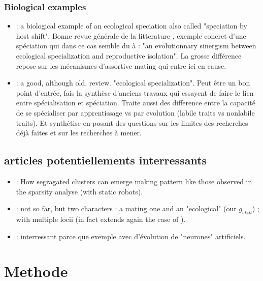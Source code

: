 \documentclass[a4paper,10pt]{article}
\begin{document}
\subsubsection{Biological examples}
\begin{itemize}
\item \cite{caillaud2000specialized} : a biological example of an ecological speciation also called "speciation by host shift". Bonne revue générale de la litterature , exemple concret d'une spéciation qui dans ce cas semble du à : "an evolutionnary sinergism between ecological specialization and reproductive isolation". La grosse différence repose sur les mécanismes d'assortive mating qui entre ici en cause.
\item \cite{futuyma88evolutionofecologicalspecialization} : a good, although old, review. "ecological specialization".  Peut être un bon point d'entrée, fais la synthèse d'anciens travaux qui essayent de faire le lien entre spécialisation et spéciation. Traite aussi des difference entre la capacité de se spécialiser par apprentissage vs par evolution (labile traits vs nonlabile traits). Et synthétise en posant des questions sur les limites des recherches déjà faites et sur les recherches à mener.

\end{itemize}
\subsection{articles potentiellements interressants}
\begin{itemize}

\item \cite{schelling71dynamicmodelssegregation} : How segragated clusters can emerge making pattern like those observed in the sparsity analyse (with static robots).
\item \cite{dieckmann99originspeciesbysympatricspeciation} : not so far, but two characters : a mating one and an "ecological" (our $g_{skill}$) ; with multiple locii (in fact extends again the case of \cite{geritz97evolutionarilysingularstrategiesadaptivegrowthbranchingevolutionarytree}).
\item \cite{holmgren07artificialneuralnetworksmodelsspecializationguildevolutionsympatricspeciation} : interressant parce que exemple avec d'évolution de "neurones" artificiels.
\end{itemize}
\section{Methode}
\end{document}
